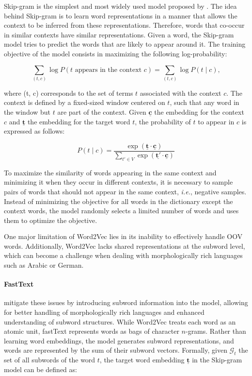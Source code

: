 Skip-gram is the simplest and most widely used model proposed by \citet{mikolov2013efficient}. The idea behind Skip-gram is to learn word representations in a manner that allows the context to be inferred from these representations. Therefore, words that co-occur in similar contexts have similar representations. Given a word, the Skip-gram model tries to predict the words that are likely to appear around it. The training objective of the model consists in maximizing the following log-probability:

\begin{equation}
    \sum_{(t, c)} \log P(t \text{ appears in the context } c) = \sum_{(t, c)} \log P(t \mid c),
\end{equation}

\noindent where (t, c) corresponds to the set of terms $t$ associated with the context $c$. The context is defined by a fixed-sized window centered on $t$, such that any word in the window but $t$ are part of the context. Given $\bm{\underline{c}}$ the embedding for the context $c$ and $\bm{\underline{t}}$ the embedding for the target word $t$, the probability of $t$ to appear in $c$ is expressed as follows:

\begin{equation}
    P(t \mid c) = \frac{\exp (\bm{\underline{t}} \cdot \bm{\underline{c}})}{\sum_{t' \in V} \exp (\bm{\underline{t'}} \cdot \bm{\underline{c}})}
\end{equation}

To maximize the similarity of words appearing in the same context and minimizing it when they occur in different contexts, it is necessary to sample pairs of words that should not appear in the same context, \textit{i.e.}, negative samples. Instead of minimizing the objective for all words in the dictionary except the context words, the model randomly selects a limited number of words and uses them to optimize the objective. 

One major limitation of Word2Vec lies in its inability to effectively handle \ac{OOV} words. Additionally, Word2Vec lacks shared representations at the subword level, which can become a challenge when dealing with morphologically rich languages such as Arabic or German.

\paragraph{FastText}  \citet{bojanowski2017enriching} mitigate these issues by introducing subword information into the model, allowing for better handling of morphologically rich languages and enhanced understanding of subword structures. While Word2Vec treats each word as an atomic unit, fastText represents words as bags of character $n$-grams. Rather than learning word embeddings, the model generates subword representations, and words are represented by the sum of their subword vectors. Formally, given $\mathcal{G}_t$ the set of all subwords of the word $t$, the target word embedding $\bm{\underline{t}}$ in the Skip-gram model can be defined as:

